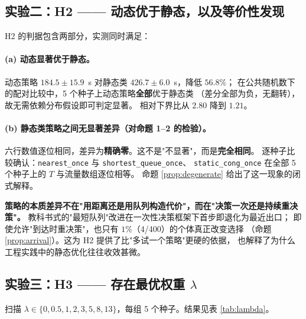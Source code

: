 \subsection{实验二：H2 —— 动态优于静态，以及等价性发现}
\label{sec:exp2}

H2 的判据包含两部分，实测同时满足：

\paragraph{(a) 动态显著优于静态。}
动态策略 $184.5\pm15.9$~s 对静态类 $426.7\pm6.0$~s，降低 $56.8\%$；
在公共随机数下的配对比较中，5 个种子上动态策略\textbf{全部}优于静态类
（差分全部为负，无翻转），故无需依赖分布假设即可判定显著。
相对下界比从 $2.80$ 降到 $1.21$。

\paragraph{(b) 静态类策略之间无显著差异（对命题 1--2 的检验）。}
六行数值逐位相同，差异为\textbf{精确零}。这不是"不显著"，而是\textbf{完全相同}。
逐种子比较确认：\texttt{nearest\_once} 与 \texttt{shortest\_queue\_once}、
\texttt{static\_cong\_once} 在全部 5 个种子上的 $T$ 与流量数组逐位相等。
命题 \ref{prop:degenerate} 给出了这一现象的闭式解释。

\begin{csfkey}[实验二的核心方法学结论]
\textbf{策略的本质差异不在"用距离还是用队列构造代价"，而在"决策一次还是持续重决策"。}
教科书式的"最短队列"改进在一次性决策框架下首步即退化为最近出口；
即使允许"到达时重决策"，也只有 $1\%$（4/400）的个体真正改变选择
（命题 \ref{prop:arrival}）。这为 H2 提供了比"多试一个策略"更硬的依据，
也解释了为什么工程实践中的静态优化往往收效甚微。
\end{csfkey}

\subsection{实验三：H3 —— 存在最优权重 $\lambda$}
\label{sec:exp3}

扫描 $\lambda\in\{0,0.5,1,2,3,5,8,13\}$，每组 5 个种子。结果见表 \ref{tab:lambda}。

